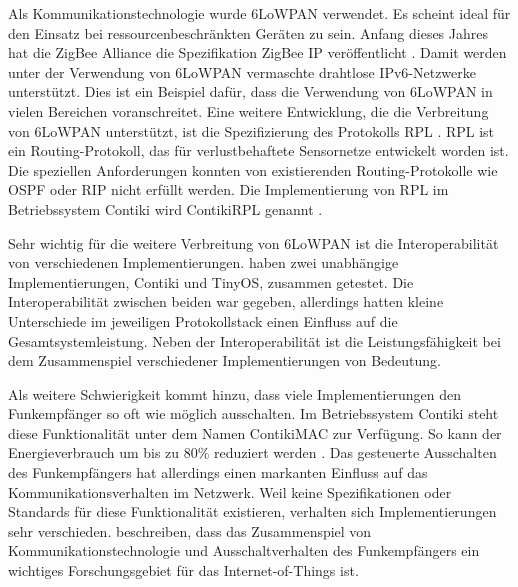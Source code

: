 Als Kommunikationstechnologie wurde 6LoWPAN verwendet. Es scheint ideal für den Einsatz bei ressourcenbeschränkten Geräten zu sein. Anfang dieses Jahres hat die ZigBee Alliance die Spezifikation ZigBee IP veröffentlicht \citep{zigbee-ip}. Damit werden unter der Verwendung von 6LoWPAN vermaschte drahtlose IPv6-Netzwerke unterstützt. Dies ist ein Beispiel dafür, dass die Verwendung von 6LoWPAN in vielen Bereichen voranschreitet. Eine weitere Entwicklung, die die Verbreitung von 6LoWPAN unterstützt, ist die Spezifizierung des Protokolls RPL \citep{RFC6550}. RPL ist ein Routing-Protokoll, das für verlustbehaftete Sensornetze entwickelt worden ist. Die speziellen Anforderungen konnten von existierenden Routing-Protokolle wie OSPF oder RIP nicht erfüllt werden. Die Implementierung von RPL im Betriebssystem Contiki wird ContikiRPL genannt \citep{tsiftes10rpl}.

Sehr wichtig für die weitere Verbreitung von 6LoWPAN ist die Interoperabilität von verschiedenen Implementierungen. \textcite{ko11beyond} haben zwei unabhängige Implementierungen, Contiki und TinyOS, zusammen getestet. Die Interoperabilität zwischen beiden war gegeben, allerdings hatten kleine Unterschiede im jeweiligen Protokollstack einen Einfluss auf die Gesamtsystemleistung. Neben der Interoperabilität ist die Leistungsfähigkeit bei dem Zusammenspiel verschiedener Implementierungen von Bedeutung.

Als weitere Schwierigkeit kommt hinzu, dass viele Implementierungen den Funkempfänger so oft wie möglich ausschalten. Im Betriebssystem Contiki steht diese Funktionalität unter dem Namen ContikiMAC zur Verfügung. So kann der Energieverbrauch um bis zu 80\% reduziert werden \citep{dunkels11contikimac}. Das gesteuerte Ausschalten des Funkempfängers hat allerdings einen markanten Einfluss auf das Kommunikationsverhalten im Netzwerk. Weil keine Spezifikationen oder Standards für diese Funktionalität existieren, verhalten sich Implementierungen sehr verschieden. \textcite{dunkels11adhoc} beschreiben, dass das Zusammenspiel von Kommunikationstechnologie und Ausschaltverhalten des Funkempfängers ein wichtiges Forschungsgebiet für das Internet-of-Things ist.



